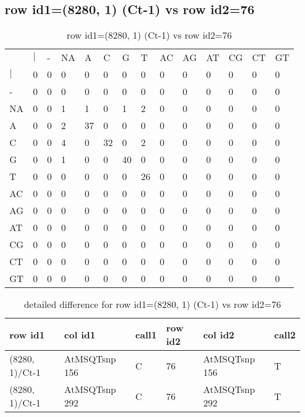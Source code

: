 \subsection{row id1=(8280, 1) (Ct-1) vs row id2=76}
\begin{center}
\begin{longtable}{|l|l|l|l|l|l|l|l|l|l|l|l|l|l|}
\caption{row id1=(8280, 1) (Ct-1) vs row id2=76} \label{table_dm438}\\
\hline
\\
\hline
&$|$&-&NA&A&C&G&T&AC&AG&AT&CG&CT&GT\\
$|$&0&0&0&0&0&0&0&0&0&0&0&0&0\\
-&0&0&0&0&0&0&0&0&0&0&0&0&0\\
NA&0&0&1&1&0&1&2&0&0&0&0&0&0\\
A&0&0&2&37&0&0&0&0&0&0&0&0&0\\
C&0&0&4&0&32&0&2&0&0&0&0&0&0\\
G&0&0&1&0&0&40&0&0&0&0&0&0&0\\
T&0&0&0&0&0&0&26&0&0&0&0&0&0\\
AC&0&0&0&0&0&0&0&0&0&0&0&0&0\\
AG&0&0&0&0&0&0&0&0&0&0&0&0&0\\
AT&0&0&0&0&0&0&0&0&0&0&0&0&0\\
CG&0&0&0&0&0&0&0&0&0&0&0&0&0\\
CT&0&0&0&0&0&0&0&0&0&0&0&0&0\\
GT&0&0&0&0&0&0&0&0&0&0&0&0&0\\
\hline
\end{longtable}
\end{center}

\begin{center}
\begin{longtable}{|l|l|l|l|l|l|}
\caption{detailed difference for row id1=(8280, 1) (Ct-1) vs row id2=76} \label{table_dm439}\\
\hline
row id1&col id1&call1&row id2&col id2&call2\\
\hline
(8280, 1)/Ct-1&AtMSQTsnp 156&C&76&AtMSQTsnp 156&T\\
(8280, 1)/Ct-1&AtMSQTsnp 292&C&76&AtMSQTsnp 292&T\\
\hline
\end{longtable}
\end{center}


